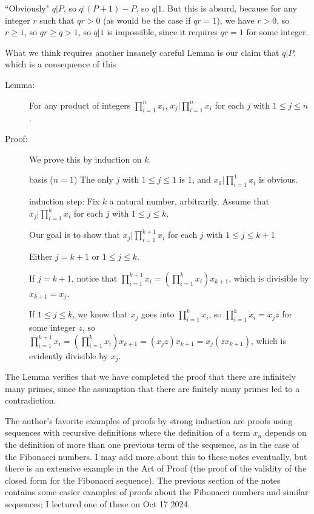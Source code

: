 \documentclass[12pt]{article}
\begin{document}
\begin{description}
``Obviously" $q|P$, so $q|(P+1)-P$, so $q|1$.  But this is absurd, because for any integer $r$ such that $qr>0$ (as would be the case if $qr=1$), we have $r>0$, so $r \geq 1$, so $qr \geq q>1$, so $q|1$ is impossible, since it requires $qr=1$ for some integer.

What we think requires another insanely careful Lemma is our claim that $q|P$, which is a consequence of this

\begin{description}

\item[Lemma:]  For any product of integers $\prod_{i=1}^nx_i$, $x_j | \prod_{i=1}^nx_i$ for each $j$ with $1 \leq j \leq n$.

\item[Proof:]  We prove this by induction on $k$.

basis ($n=1$)  The only $j$ with $1 \leq j \leq 1$ is 1, and $x_1 | \prod_{i=1}^1 x_i$ is obvious.

induction step:  Fix $k$ a natural number, arbitrarily.  Assume that $x_j | \prod_{i=1}^kx_i$ for each $j$ with $1 \leq j \leq k$.

Our goal is to show that $x_j | \prod_{i=1}^{k+1}x_i$ for each $j$ with $1 \leq j \leq k+1$

Either $j=k+1$ or $1 \leq j \leq k$.

If $j=k+1$, notice that $\prod_{i=1}^{k+1}x_i = (\prod_{i=1}^kx_i)x_{k+1}$, which is divisible by $x_{k+1} = x_j$.

If $1 \leq j \leq k$, we know that $x_j$ goes into $\prod_{i=1}^kx_i$, so $\prod_{i=1}^kx_i=x_jz$ for some integer $z$,
so $\prod_{i=1}^{k+1}x_i = (\prod_{i=1}^kx_i)x_{k+1}= (x_jz)x_{k+1} = x_j(zx_{k+1})$, which is evidently divisible by $x_j$.

\end{description}

The Lemma verifies that we have completed the proof that there are infinitely many primes, since the assumption that there are finitely many primes led to a contradiction.

\end{description}

The author's favorite examples of proofs by strong induction are proofs using sequences with recursive definitions where the definition of a term $x_{n}$ depends on the definition of more than one previous term of the sequence, as in the case of the Fibonacci numbers.  I may add more about this to these notes eventually, but there is an extensive example in the Art of Proof (the proof of the validity of the closed form for the Fibonacci sequence).  The previous section of the notes contains some easier examples of proofs about the Fibonacci numbers and similar sequences; I lectured one of these on Oct 17 2024.
\end{document}
